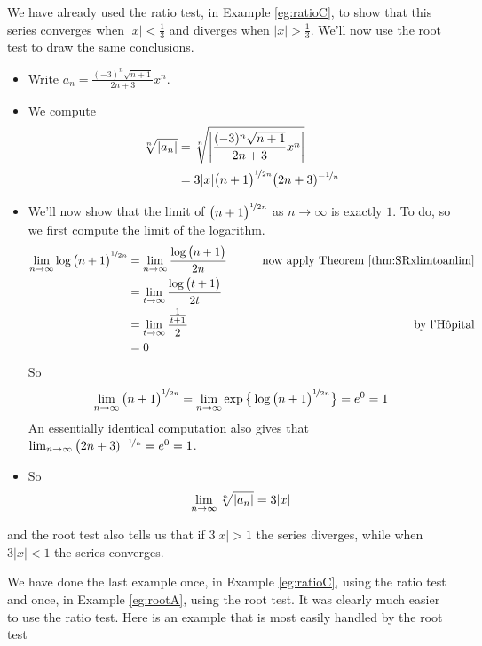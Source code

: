 \begin{eg}[$\sum_{n=1}^\infty \frac{ (-3)^n \sqrt{n+1}}{2n+3}x^n$]
\label{eg:rootA}
 We have already used the ratio test, in Example \ref{eg:ratioC},
to show that this series converges when $|x|<\frac{1}{3}$ and diverges
when $|x|>\frac{1}{3}$. We'll now use the root test to draw the
same conclusions.
 \begin{itemize}
  \item  Write $a_n=  \frac{ (-3)^n \sqrt{n+1}}{2n+3}x^n$.
  \item We compute
 \begin{align*}
  \root{n}\of{|a_n|}
  &= \root{n}\of{ \bigg|\frac{ (-3)^n \sqrt{n+1}}{2n+3}x^n\bigg|}\\
  &= 3 |x|\big(n+1\big)^{\nicefrac{1}{2n}}  \big(2n+3)^{-\nicefrac{1}{n}}
\end{align*}
\item We'll now show that the limit of $\big(n+1\big)^{\nicefrac{1}{2n}}$
as $n\to\infty$ is exactly $1$. To do, so we first compute the limit
of the logarithm.
\begin{align*}
\lim_{n\to\infty}\log \big(n+1\big)^{\nicefrac{1}{2n}}
&=\lim_{n\to\infty}\frac{\log \big(n+1\big)}{2n}
\qquad&\text{now apply Theorem \ref{thm:SRxlimtoanlim}} \\
&=\lim_{t\to\infty}\frac{\log \big(t+1\big)}{2t} \\
&=\lim_{t\to\infty}\frac{\frac{1}{t+1}}{2}
\qquad&\text{by l'H\^opital} \\
&=0
\end{align*}
So
\begin{align*}
\lim_{n\to\infty}\big(n+1\big)^{\nicefrac{1}{2n}}
=\lim_{n\to\infty}\exp\big\{\log \big(n+1\big)^{\nicefrac{1}{2n}}\big\}
= e^0=1
\end{align*}
An essentially identical computation also gives that
$\lim_{n\to\infty}\big(2n+3)^{-\nicefrac{1}{n}} = e^0=1$.
\item So
\begin{align*}
\lim_{n\to\infty}\root{n}\of{|a_n|}
= 3 |x|
\end{align*}
\end{itemize}
and the root test also tells us that if $3|x|>1$ the series diverges,
while when $3|x|<1$ the series converges.
\end{eg}
We have done the last example once, in Example \ref{eg:ratioC},
using the ratio test and once, in Example \ref{eg:rootA},
using the root test. It was clearly much easier to use the ratio test.
Here is an example that is most easily handled by the root test

